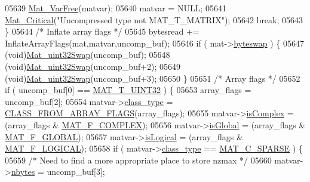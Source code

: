 \begin{DoxyCode}
{{{{{{{{{{{{{{{{{{{{{{{{{{{{{{{{{{05639                 \hyperlink{group___m_a_t_ga1d14716f7450530fd1c9d02413787f0e}{Mat\_VarFree}(matvar);
05640                 matvar = NULL;
05641                 \hyperlink{group__mat__util_gaf51f2bfbb5580f575e4dd79757e2b80c}{Mat\_Critical}(\textcolor{stringliteral}{"Uncompressed type not MAT\_T\_MATRIX"});
05642                 \textcolor{keywordflow}{break};
05643             \}
05644             \textcolor{comment}{/* Inflate array flags */}
05645             bytesread += InflateArrayFlags(mat,matvar,uncomp\_buf);
05646             \textcolor{keywordflow}{if} ( mat->\hyperlink{struct__mat__t_a99d207977af5e04941ace56d71817a40}{byteswap} ) \{
05647                 (void)\hyperlink{endian_8c_a8cb0d0750e2eaf9840d95db531934f4f}{Mat\_uint32Swap}(uncomp\_buf);
05648                 (void)\hyperlink{endian_8c_a8cb0d0750e2eaf9840d95db531934f4f}{Mat\_uint32Swap}(uncomp\_buf+2);
05649                 (void)\hyperlink{endian_8c_a8cb0d0750e2eaf9840d95db531934f4f}{Mat\_uint32Swap}(uncomp\_buf+3);
05650             \}
05651             \textcolor{comment}{/* Array flags */}
05652             \textcolor{keywordflow}{if} ( uncomp\_buf[0] == \hyperlink{group___m_a_t_ggacf7b3b879282b7ab3a51190e49bf3453aa397e285a23fe240368b752897652c6a}{MAT\_T\_UINT32} ) \{
05653                 array\_flags = uncomp\_buf[2];
05654                 matvar->\hyperlink{group___m_a_t_aff13035bf3265dd7d9425e5d40c839d4}{class\_type} = \hyperlink{mat5_8c_a85a616d27707e89bda9fd2e9bbb6a586}{CLASS\_FROM\_ARRAY\_FLAGS}(array\_flags);
05655                 matvar->\hyperlink{group___m_a_t_aeb03b3a69f108dc05470b00443a43739}{isComplex}  = (array\_flags & \hyperlink{group___m_a_t_ggab9d6ef9e3ddca78a317b173f01d53fbbacd7b091a11184aad7fc6078c04470780}{MAT\_F\_COMPLEX});
05656                 matvar->\hyperlink{group___m_a_t_af26c71c4c0ddb14931d15910dddac1bc}{isGlobal}   = (array\_flags & \hyperlink{group___m_a_t_ggab9d6ef9e3ddca78a317b173f01d53fbba49084e0c796aa7963e53f7539525d40d}{MAT\_F\_GLOBAL});
05657                 matvar->\hyperlink{group___m_a_t_a866c1539e68073a837833d74cd4a65be}{isLogical}  = (array\_flags & \hyperlink{group___m_a_t_ggab9d6ef9e3ddca78a317b173f01d53fbba57eb5c6e200bcbc0f1b7982f29a169c2}{MAT\_F\_LOGICAL});
05658                 \textcolor{keywordflow}{if} ( matvar->\hyperlink{group___m_a_t_aff13035bf3265dd7d9425e5d40c839d4}{class\_type} == \hyperlink{group___m_a_t_ggad4d60ae7b709fc81bfd744fb4c857c40a0d5655b7e6178a2242cb3bb56ff4c8d2}{MAT\_C\_SPARSE} ) \{
05659                     \textcolor{comment}{/* Need to find a more appropriate place to store nzmax */}
05660                     matvar->\hyperlink{group___m_a_t_abf1c844540503be2df9bb3db93cfe307}{nbytes} = uncomp\_buf[3];
}}}}}}}}}}}}}}}}}}}}}}}}}}}}}}}}}}
\end{DoxyCode}
